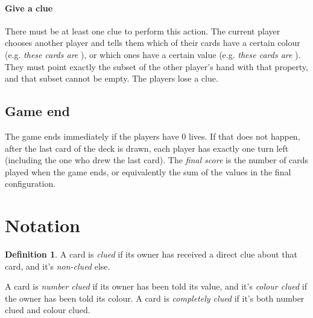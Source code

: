 \documentclass[a4paper]{article}
\theoremstyle{plain}
\theoremstyle{definition}
\newtheorem{definition}[theorem]{Definition}
\newtheorem{note}[theorem]{Note}
\begin{document}
\paragraph{Give a clue} There must be at least one clue to perform this action. The current player chooses another player and tells them which of their cards have a certain colour (e.g. \emph{these cards are }), or which ones have a certain value (e.g. \emph{these cards are }). They must point exactly the subset of the other player's hand with that property, and that subset cannot be empty. The players lose a clue.

\subsection{Game end}

The game ends immediately if the players have 0 lives. If that does not happen, after the last card of the deck is drawn, each player has exactly one turn left (including the one who drew the last card). The \emph{final score} is the number of cards played when the game ends, or equivalently the sum of the values in the final configuration.

%

\section{Notation}

\begin{definition}
	A card is \emph{clued} if its owner has received a direct clue about that card, and it's \emph{non-clued} else.
	
	A card is \emph{number clued} if its owner has been told its value, and it's \emph{colour clued} if the owner has been told its colour. A card is \emph{completely clued} if it's both number clued and colour clued.
\end{definition}
\end{document}
